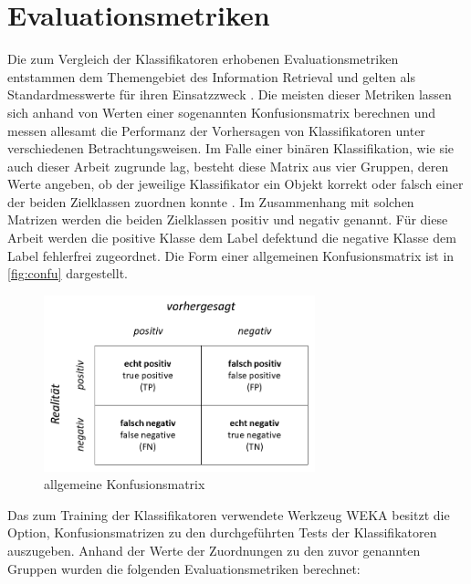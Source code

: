 \section{Evaluationsmetriken}
\label{eval-metrics}

Die zum Vergleich der Klassifikatoren erhobenen Evaluationsmetriken entstammen dem Themengebiet des Information Retrieval und gelten als Standardmesswerte für ihren Einsatzzweck \cite{Sammut2017}. Die meisten dieser Metriken lassen sich anhand von Werten einer sogenannten Konfusionsmatrix berechnen und messen allesamt die Performanz der Vorhersagen von Klassifikatoren unter verschiedenen Betrachtungsweisen. Im Falle einer binären Klassifikation,  wie sie auch dieser Arbeit zugrunde lag, besteht diese Matrix aus vier Gruppen, deren Werte angeben, ob der jeweilige Klassifikator ein Objekt korrekt oder falsch einer der beiden Zielklassen zuordnen konnte \cite{Sammut2017}. Im Zusammenhang mit solchen Matrizen werden die beiden Zielklassen \glqq positiv\grqq{} und \glqq negativ\grqq{} genannt. Für diese Arbeit werden die positive Klasse dem Label \glqq defekt\grqq und die negative Klasse dem Label \glqq fehlerfrei\grqq{} zugeordnet. Die Form einer allgemeinen Konfusionsmatrix ist in \autoref{fig:confu} dargestellt.

\begin{figure}[H]
    \centering
    \includegraphics[width=0.7\textwidth]{images/Confusion}
    \caption{allgemeine Konfusionsmatrix\label{fig:confu}}
\end{figure}

Das zum Training der Klassifikatoren verwendete Werkzeug WEKA besitzt die Option, Konfusionsmatrizen zu den durchgeführten Tests der Klassifikatoren auszugeben. Anhand der Werte der Zuordnungen zu den zuvor genannten Gruppen wurden die folgenden Evaluationsmetriken berechnet: 

